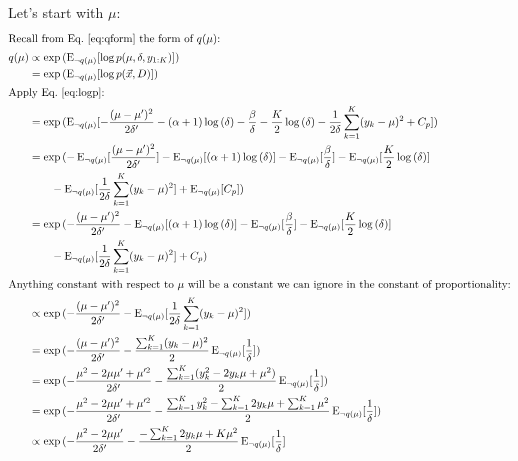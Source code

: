 \documentclass[12pt]{article}
\newcommand{\E}{\operatorname{E}}
\begin{document}
Let's start with $\mu$:
\begin{align}
    \intertext{Recall from Eq.~\ref{eq:qform} the form of $q(\mu)$:}
    q(\mu) &\propto \exp{(\E_{\neg q(\mu)}[\log{p(\mu, \delta, y_{1:K})}])}
    \nonumber \\
    &= \exp{(\E_{\neg q(\mu)}[\log{p(\vec{x}, D)}])}
    \nonumber \\
    \intertext{Apply Eq.~\ref{eq:logp}:}
    &= \exp{(\E_{\neg q(\mu)}[-\frac{(\mu-\mu')^2}{2\delta'}
    - (\alpha+1)\log{(\delta)} - \frac{\beta}{\delta}
    - \frac{K}{2}\log{(\delta)}
    - \frac{1}{2\delta} \sum_{k=1}^{K} (y_{k} - \mu)^2
    + C_p])}
    \nonumber \\
    &= \exp{}(-\E_{\neg q(\mu)}[\frac{(\mu-\mu')^2}{2\delta'}]
    - \E_{\neg q(\mu)}[(\alpha+1)\log{(\delta)}] - \E_{\neg
    q(\mu)}[\frac{\beta}{\delta}]
    - \E_{\neg q(\mu)}[\frac{K}{2}\log{(\delta)}]
    \nonumber \\
    &\qquad
    - \E_{\neg q(\mu)}[\frac{1}{2\delta} \sum_{k=1}^{K} (y_{k} - \mu)^2]
    + \E_{\neg q(\mu)}[C_p])
    \nonumber \\
    &= \exp{}(-\frac{(\mu-\mu')^2}{2\delta'}
    - \E_{\neg q(\mu)}[(\alpha+1)\log{(\delta)}] - \E_{\neg
    q(\mu)}[\frac{\beta}{\delta}]
    - \E_{\neg q(\mu)}[\frac{K}{2}\log{(\delta)}]
    \nonumber \\
    &\qquad
    - \E_{\neg q(\mu)}[\frac{1}{2\delta} \sum_{k=1}^{K} (y_{k} - \mu)^2]
    + C_p)
    \nonumber \\
    \intertext{Anything constant with respect to $\mu$ will be a constant we can
    ignore in the constant of proportionality:}
    &\propto \exp{(-\frac{(\mu-\mu')^2}{2\delta'}
    - \E_{\neg q(\mu)}[\frac{1}{2\delta} \sum_{k=1}^{K} (y_{k} - \mu)^2])}
    \nonumber \\
    &= \exp{(-\frac{(\mu-\mu')^2}{2\delta'}
        - \frac{\sum_{k=1}^{K}(y_{k}-\mu)^2}{2}\E_{\neg q(\mu)}[\frac{1}{\delta}]
    )}
    \nonumber \\
    &= \exp{(-\frac{\mu^2 - 2\mu\mu' +\mu'^2}{2\delta'}
        - \frac{\sum_{k=1}^{K}(y_{k}^2 -2y_{k}\mu + \mu^2)}{2}\E_{\neg q(\mu)}[\frac{1}{\delta}]
    )}
    \nonumber \\
    &= \exp{(-\frac{\mu^2 - 2\mu\mu' +\mu'^2}{2\delta'}
        - \frac{\sum_{k=1}^{K}y_{k}^2 -\sum_{k=1}^{K}2y_{k}\mu + \sum_{k=1}^{K}\mu^2}{2}\E_{\neg q(\mu)}[\frac{1}{\delta}]
    )}
    \nonumber \\
    &\propto \exp{(-\frac{\mu^2 - 2\mu\mu'}{2\delta'}
        - \frac{-\sum_{k=1}^{K}2y_{k}\mu + K\mu^2}{2}\E_{\neg q(\mu)}[\frac{1}{\delta}]
}
\end{align}
\end{document}
